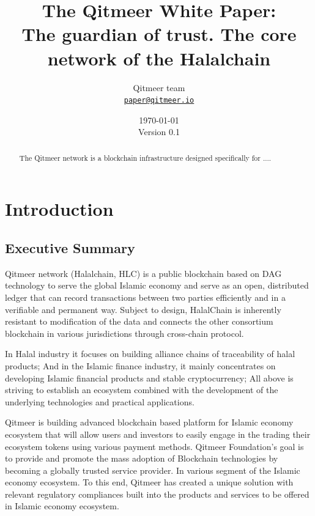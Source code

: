 \documentclass[a4paper,11pt]{article}
\title{\LARGE The Qitmeer White Paper:\\
	\Large The guardian of trust. The core network of the Halalchain}
\author{
	Qitmeer team\\
		\small\href{mailto:paper@qitmeer.io}
			{\nolinkurl{paper@qitmeer.io}}
	}
\date{\today\\\small Version 0.1}
\newcommand{\watermark}[3]{\AddToShipoutPictureBG{
	\parbox[b][\paperheight]{\paperwidth}{
		\vfill%
		\centering%
	\tikz[remember picture, overlay]%
	  \node [rotate = #1, scale = #2] at (current page.center)%
	      {\textcolor{gray!80!cyan!30}{#3}};
	  \vfill}}}
\begin{document}
\clearpage
\pagestyle{plain}

\maketitle


\begin{abstract}

The Qitmeer network is a blockchain infrastructure designed specifically for ....
\end{abstract}

\section{Introduction}

\subsection{Executive Summary}

Qitmeer network (Halalchain, HLC) is a public blockchain based on DAG\cite{DAG} technology to serve the global Islamic economy and serve as an open, distributed ledger that can record transactions between two parties efficiently and in a verifiable and permanent way. Subject to design, HalalChain is inherently resistant to modification of the data and connects the other consortium blockchain in various jurisdictions through cross-chain protocol. 

In Halal industry it focuses on building alliance chains of traceability of halal products; And in the Islamic finance industry, it mainly concentrates on developing Islamic financial products and stable cryptocurrency; All above is striving to establish an ecosystem combined with the development of the underlying technologies and practical applications.

Qitmeer is building advanced blockchain based platform for Islamic economy ecosystem that will allow users and investors to easily engage in the trading their ecosystem tokens using various payment methods. Qitmeer Foundation’s goal is to provide and promote the mass adoption of Blockchain technologies by becoming a globally trusted service provider. In various segment of the Islamic economy ecosystem. To this end, Qitmeer has created a unique solution with relevant regulatory compliances built into the products and services to be offered in Islamic economy ecosystem.
\end{document}
